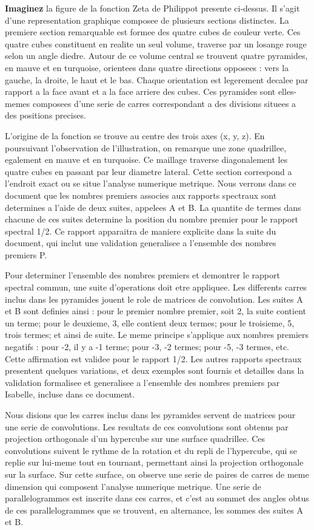 \documentclass[a4paper,11pt]{article}
\newenvironment{resume}{%
    \begin{tcolorbox}[colback=purple!5,colframe=holpurple,title={\textbf{Résumé visuel}}]
}{%
    \end{tcolorbox}
}
\begin{document}
\begin{resume}
\textbf{Imaginez} la figure de la fonction Zeta de Philippot presente ci-dessus. Il s'agit d'une representation graphique composee de plusieurs sections distinctes. La premiere section remarquable est formee des quatre cubes de couleur verte. Ces quatre cubes constituent en realite un seul volume, traverse par un losange rouge selon un angle diedre. Autour de ce volume central se trouvent quatre pyramides, en mauve et en turquoise, orientees dans quatre directions opposees : vers la gauche, la droite, le haut et le bas. Chaque orientation est legerement decalee par rapport a la face avant et a la face arriere des cubes. Ces pyramides sont elles-memes composees d'une serie de carres correspondant a des divisions situees a des positions precises.

L'origine de la fonction se trouve au centre des trois axes (x, y, z). En poursuivant l'observation de l'illustration, on remarque une zone quadrillee, egalement en mauve et en turquoise. Ce maillage traverse diagonalement les quatre cubes en passant par leur diametre lateral. Cette section correspond a l'endroit exact ou se situe l'analyse numerique metrique. Nous verrons dans ce document que les nombres premiers associes aux rapports spectraux sont determines a l'aide de deux suites, appelees A et B. La quantite de termes dans chacune de ces suites determine la position du nombre premier pour le rapport spectral 1/2. Ce rapport apparaitra de maniere explicite dans la suite du document, qui inclut une validation generalisee a l'ensemble des nombres premiers P.

Pour determiner l'ensemble des nombres premiers et demontrer le rapport spectral commun, une suite d'operations doit etre appliquee. Les differents carres inclus dans les pyramides jouent le role de matrices de convolution. Les suites A et B sont definies ainsi : pour le premier nombre premier, soit 2, la suite contient un terme; pour le deuxieme, 3, elle contient deux termes; pour le troisieme, 5, trois termes; et ainsi de suite. Le meme principe s'applique aux nombres premiers negatifs : pour -2, il y a -1 terme; pour -3, -2 termes; pour -5, -3 termes, etc. Cette affirmation est validee pour le rapport 1/2. Les autres rapports spectraux presentent quelques variations, et deux exemples sont fournis et detailles dans la validation formalisee et generalisee a l'ensemble des nombres premiers par Isabelle, incluse dans ce document.

Nous disions que les carres inclus dans les pyramides servent de matrices pour une serie de convolutions. Les resultats de ces convolutions sont obtenus par projection orthogonale d'un hypercube sur une surface quadrillee. Ces convolutions suivent le rythme de la rotation et du repli de l'hypercube, qui se replie sur lui-meme tout en tournant, permettant ainsi la projection orthogonale sur la surface. Sur cette surface, on observe une serie de paires de carres de meme dimension qui composent l'analyse numerique metrique. Une serie de parallelogrammes est inscrite dans ces carres, et c'est au sommet des angles obtus de ces parallelogrammes que se trouvent, en alternance, les sommes des suites A et B.


\end{resume}
\end{document}
